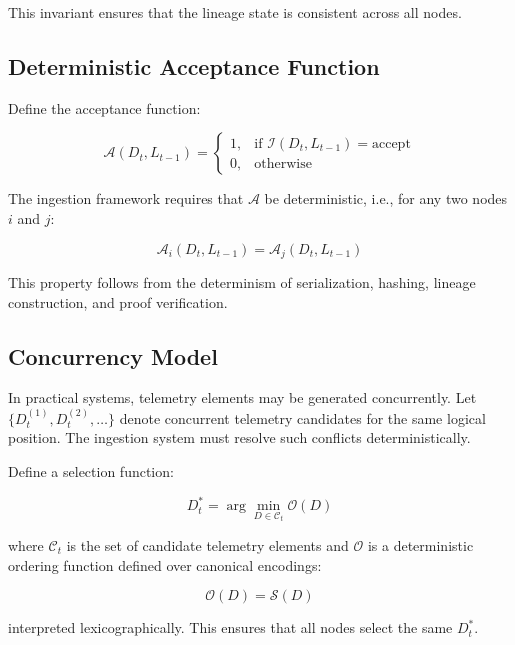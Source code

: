 This invariant ensures that the lineage state is consistent across all nodes.

\subsection{Deterministic Acceptance Function}

Define the acceptance function:

\begin{equation}
\mathcal{A}(D_t, L_{t-1}) =
\begin{cases}
1, & \text{if } \mathcal{I}(D_t, L_{t-1}) = \text{accept} \\
0, & \text{otherwise}
\end{cases}
\end{equation}

The ingestion framework requires that $\mathcal{A}$ be deterministic, i.e., for any two nodes $i$ and $j$:

\begin{equation}
\mathcal{A}_i(D_t, L_{t-1}) = \mathcal{A}_j(D_t, L_{t-1})
\end{equation}

This property follows from the determinism of serialization, hashing, lineage construction, and proof verification.

\subsection{Concurrency Model}

In practical systems, telemetry elements may be generated concurrently. Let $\{D_t^{(1)}, D_t^{(2)}, \dots\}$ denote concurrent telemetry candidates for the same logical position. The ingestion system must resolve such conflicts deterministically.

Define a selection function:

\begin{equation}
D_t^* = \arg\min_{D \in \mathcal{C}_t} \mathcal{O}(D)
\end{equation}

where $\mathcal{C}_t$ is the set of candidate telemetry elements and $\mathcal{O}$ is a deterministic ordering function defined over canonical encodings:

\begin{equation}
\mathcal{O}(D) = \mathcal{S}(D)
\end{equation}

interpreted lexicographically. This ensures that all nodes select the same $D_t^*$.


